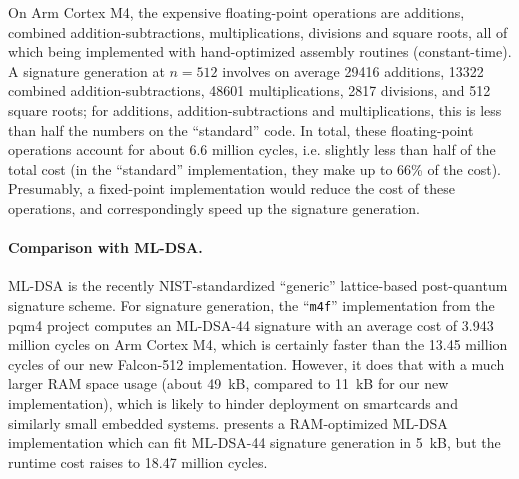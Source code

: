 \documentclass{llncs}
\begin{document}
On Arm Cortex M4, the expensive floating-point operations are additions,
combined addition-subtractions, multiplications, divisions and square
roots, all of which being implemented with hand-optimized assembly
routines (constant-time). A signature generation at $n = 512$ involves
on average 29416 additions, 13322 combined addition-subtractions, 48601
multiplications, 2817 divisions, and 512 square roots; for additions,
addition-subtractions and multiplications, this is less than half the
numbers on the ``standard'' code. In total, these floating-point
operations account for about 6.6 million cycles, i.e. slightly less than
half of the total cost (in the ``standard'' implementation, they make up
to 66\% of the cost). Presumably, a fixed-point implementation would
reduce the cost of these operations, and correspondingly speed up the
signature generation.

\paragraph{Comparison with ML-DSA.}
ML-DSA\cite{Fips204} is the recently NIST-standardized ``generic''
lattice-based post-quantum signature scheme. For signature generation,
the ``\verb+m4f+'' implementation from the pqm4
project\cite{KanRijSchSto2019} computes an ML-DSA-44 signature with an
average cost of 3.943 million cycles on Arm Cortex M4, which is
certainly faster than the 13.45 million cycles of our new Falcon-512
implementation. However, it does that with a much larger RAM space usage
(about 49~kB, compared to 11~kB for our new implementation), which is
likely to hinder deployment on smartcards and similarly small embedded
systems. \cite{BosRenSpr2022} presents a RAM-optimized ML-DSA
implementation which can fit ML-DSA-44 signature generation in 5~kB, but
the runtime cost raises to 18.47 million cycles.
\end{document}

